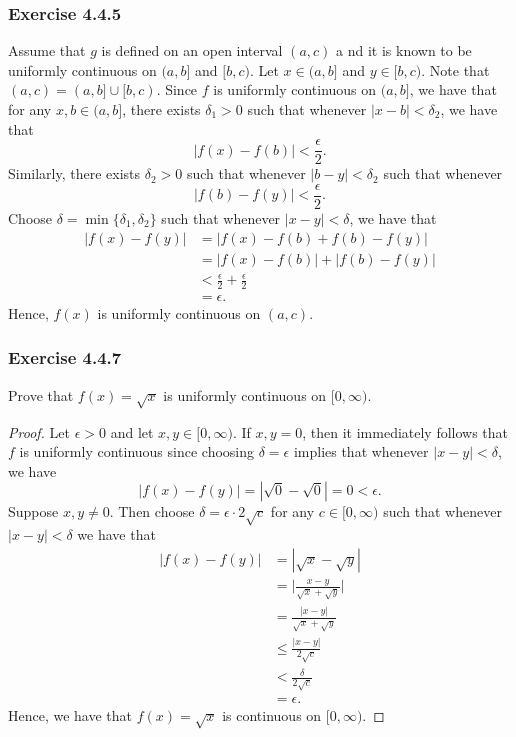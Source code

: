 \subsubsection{Exercise 4.4.5} Assume that \( g  \) is defined on an open interval \( (a,c) \) a nd it is known to be uniformly continuous on \( (a,b]  \) and \( [b, c) \). Let \( x \in (a,b] \) and \( y \in [b,c) \). Note that \( (a,c) = (a,b] \cup [b,c) \). Since \( f  \) is uniformly continuous on \( (a,b] \), we have that for any \( x, b \in (a,b] \), there exists \( \delta_1 > 0  \) such that whenever \( | x - b  | < \delta_2   \), we have that 
\[ | f(x) - f(b)  | < \frac{ \epsilon  }{ 2 } .\] Similarly, there exists \( \delta_2 > 0  \) such that whenever \( | b - y  | < \delta_2 \) such that whenever 
\[  | f(b) - f(y) | < \frac{ \epsilon  }{ 2 } . \]Choose \( \delta  =  \min \{ \delta_1, \delta_2  \}  \) such that whenever \( | x - y  | < \delta  \), we have that 
\begin{align*}
    | f(x) - f(y)  | &= | f(x) - f(b) + f(b) - f(y)  |  \\
                     &= | f(x) - f(b)  | + | f(b) - f(y) | \\
                     &< \frac{ \epsilon  }{ 2 } + \frac{ \epsilon  }{ 2 } \\ 
                     &= \epsilon.
\end{align*}
Hence, \( f(x)  \) is uniformly continuous on \( (a,c) \).




\subsubsection{Exercise 4.4.7} Prove that \( f(x) = \sqrt{ x  }  \) is uniformly continuous on \( [0,\infty ) \).
\begin{proof}
    Let \( \epsilon > 0  \) and let \( x, y \in [0, \infty ) \). If \( x,y = 0   \), then it immediately follows that \( f  \) is uniformly continuous since choosing \( \delta = \epsilon  \) implies that whenever \( | x - y  | < \delta  \), we have 
    \[ | f(x) - f(y) | = | \sqrt{ 0 } - \sqrt{ 0 }   | = 0 < \epsilon.   \]Suppose \( x,y \neq  0  \). Then choose \( \delta = \epsilon  \cdot 2\sqrt{ c  }  \) for any \( c \in [0, \infty)\) such that whenever \( | x - y  | < \delta  \) we have that
    \begin{align*}
        | f(x) - f(y)  | &= | \sqrt{ x } - \sqrt{ y }  |  \\
                         &= \Big| \frac{ x - y  }{ \sqrt{ x  } + \sqrt{ y }  }  \Big| \\
                         &= \frac{ | x - y  |  }{  \sqrt{ x  } + \sqrt{ y }    } \\
                         &\leq \frac{ | x - y  |  }{   2 \sqrt{ c }    }  \\
                         &< \frac{ \delta  }{ 2 \sqrt{ c }  }  \\
                         &= \epsilon. 
    \end{align*}
    Hence, we have that \( f(x)  = \sqrt{ x  }  \) is continuous on \( [0,\infty) \).
\end{proof}

